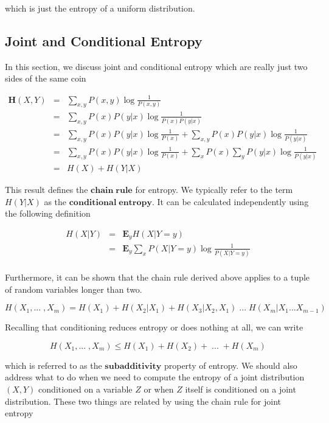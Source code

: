 \documentclass[a4paper,11pt]{book}
\begin{document}
which is just the entropy of a uniform distribution. 

\subsection{Joint and Conditional Entropy}

In this section, we discuss joint and conditional entropy which are really just two sides of the same coin

\begin{eqnarray*}
\textbf{H}(X,Y) &=& \sum_{x,y} P(x,y)\log \frac{1}{P(x,y)} \\
&=& \sum_{x,y} P(x)P(y|x)\log \frac{1}{P(x)P(y|x)}\\
&=& \sum_{x,y}  P(x)P(y|x)\log \frac{1}{P(x)} + \sum_{x,y}  P(x)P(y|x)\log\frac{1}{P(y|x)} \\
&=& \sum_{x,y}  P(x)P(y|x)\log \frac{1}{P(x)} + \sum_{x}  P(x)\sum_{y}P(y|x)\log\frac{1}{P(y|x)} \\
&=& H(X) + H(Y|X)
\end{eqnarray*}

This result defines the $\mathbf{chain \; rule}$ for entropy. We typically refer to the term $H(Y|X)$ as the $\mathbf{conditional \; entropy}$. It can be calculated independently using the following definition

\begin{eqnarray*}
H(X|Y) &=& \mathbf{E}_{y} H(X|Y=y)\\
&=& \mathbf{E}_{y} \sum_{x} P(X|Y=y)\log \frac{1}{P(X|Y=y)}\\
\end{eqnarray*}


Furthermore, it can be shown that the chain rule derived above applies to a tuple of random variables longer than two. 

\begin{equation*}
H(X_{1}, ...\;, X_{m}) = H(X_{1}) + H(X_{2}|X_{1}) + H(X_{3}|X_{2},X_{1}) \;...\; H(X_{m}|X_{1} ... X_{m-1}) 
\end{equation*}

Recalling that conditioning reduces entropy or does nothing at all, we can write

\begin{equation*}
H(X_{1}, ...\;, X_{m}) \leq H(X_{1}) + H(X_{2}) +  \;...\; + H(X_{m}) 
\end{equation*}

which is referred to as the $\mathbf{subadditivity}$ property of entropy. We should also address what to do when we need to compute the entropy of a joint distribution $(X,Y)$ conditioned on a variable $Z$ or when $Z$ itself is conditioned on a joint distribution. These two things are related by using the chain rule for joint entropy
\end{document}

